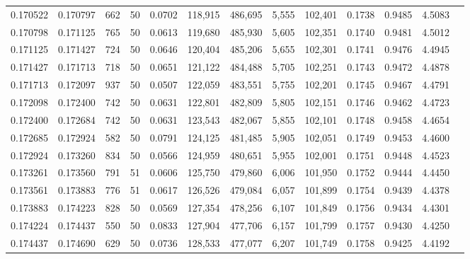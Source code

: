 \begin{tabular}{rrrrrrrrrrrrr}
0.170522 & 0.170797 &   662 &  50 &                                     0.0702 & 118,915 & 486,695 &   5,555 & 102,401 & 0.1738 & 0.9485 & 4.5083 \\
0.170798 & 0.171125 &   765 &  50 &                                     0.0613 & 119,680 & 485,930 &   5,605 & 102,351 & 0.1740 & 0.9481 & 4.5012 \\
0.171125 & 0.171427 &   724 &  50 &                                     0.0646 & 120,404 & 485,206 &   5,655 & 102,301 & 0.1741 & 0.9476 & 4.4945 \\
0.171427 & 0.171713 &   718 &  50 &                                     0.0651 & 121,122 & 484,488 &   5,705 & 102,251 & 0.1743 & 0.9472 & 4.4878 \\
0.171713 & 0.172097 &   937 &  50 &                                     0.0507 & 122,059 & 483,551 &   5,755 & 102,201 & 0.1745 & 0.9467 & 4.4791 \\
0.172098 & 0.172400 &   742 &  50 &                                     0.0631 & 122,801 & 482,809 &   5,805 & 102,151 & 0.1746 & 0.9462 & 4.4723 \\
0.172400 & 0.172684 &   742 &  50 &                                     0.0631 & 123,543 & 482,067 &   5,855 & 102,101 & 0.1748 & 0.9458 & 4.4654 \\
0.172685 & 0.172924 &   582 &  50 &                                     0.0791 & 124,125 & 481,485 &   5,905 & 102,051 & 0.1749 & 0.9453 & 4.4600 \\
0.172924 & 0.173260 &   834 &  50 &                                     0.0566 & 124,959 & 480,651 &   5,955 & 102,001 & 0.1751 & 0.9448 & 4.4523 \\
0.173261 & 0.173560 &   791 &  51 &                                     0.0606 & 125,750 & 479,860 &   6,006 & 101,950 & 0.1752 & 0.9444 & 4.4450 \\
0.173561 & 0.173883 &   776 &  51 &                                     0.0617 & 126,526 & 479,084 &   6,057 & 101,899 & 0.1754 & 0.9439 & 4.4378 \\
0.173883 & 0.174223 &   828 &  50 &                                     0.0569 & 127,354 & 478,256 &   6,107 & 101,849 & 0.1756 & 0.9434 & 4.4301 \\
0.174224 & 0.174437 &   550 &  50 &                                     0.0833 & 127,904 & 477,706 &   6,157 & 101,799 & 0.1757 & 0.9430 & 4.4250 \\
0.174437 & 0.174690 &   629 &  50 &                                     0.0736 & 128,533 & 477,077 &   6,207 & 101,749 & 0.1758 & 0.9425 & 4.4192 \\

\end{tabular}
